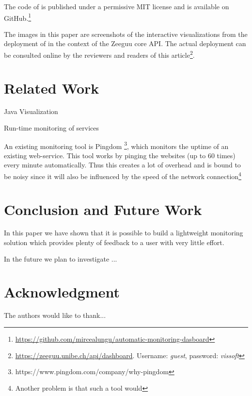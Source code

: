 \documentclass[conference]{IEEEtran}
\begin{document}
    The code of \tool is published under a permissive MIT license and is available on GitHub.\footnote{\url{https://github.com/mircealungu/automatic-monitoring-dasboard}}

    The images in this paper are screenshots of the interactive visualizations from the deployment of \tool in the context of the Zeeguu core API. The actual deployment can be consulted online by the reviewers and readers of this article\footnote{\url{https://zeeguu.unibe.ch/api/dashboard}. Username: {\em guest}, password: {\em vissoft}}.


\section{Related Work}


Java Visualization \cite{Pauw02a}

Run-time monitoring of services \cite{ghezzi2007run}

An existing monitoring tool is Pingdom \footnote{https://www.pingdom.com/company/why-pingdom}, which monitors the uptime of an existing web-service. This tool works by pinging the websites (up to 60 times) every minute automatically. Thus this creates a lot of overhead and is bound to be noisy since it will also be influenced by the speed of the network connection\footnote{Another problem is that such a tool would }


\section{Conclusion and Future Work}

In this paper we have shown that it is possible to build a lightweight monitoring solution which provides plenty of feedback to a user with very little effort. 

In the future we plan to investigate ...





\section*{Acknowledgment}


The authors would like to thank...










\end{document}
